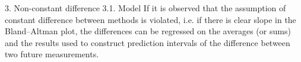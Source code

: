3. Non-constant difference
3.1. Model
If it is observed that the assumption of constant difference between methods is violated, i.e. if there is clear slope in the
Bland–Altman plot, the differences can be regressed on the averages (or sums) and the results used to construct prediction
intervals of the difference between two future measurements.
